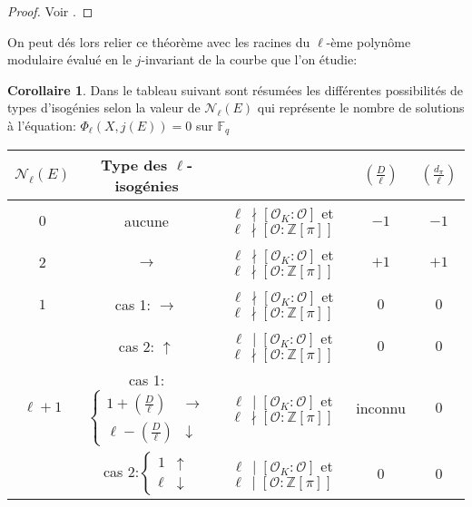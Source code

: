 \documentclass[10pt,a4paper]{book}
\theoremstyle{plain}
\theoremstyle{definition}
\theoremstyle{definition}
\newtheorem{cor}[thm]{Corollaire}
\theoremstyle{definition}
\theoremstyle{definition}
\theoremstyle{remark}
\theoremstyle{remark}
\theoremstyle{definition}
\begin{document}
\begin{proof}
Voir \cite[Proposition 23]{Kohel96}.
\end{proof}

On peut dés lors relier ce théorème avec les racines du $\ell$-ème polynôme modulaire évalué en le $j$-invariant de la courbe que l'on étudie:

\begin{cor}
\label{cor:tab:vol} 
Dans le tableau suivant sont résumées les différentes possibilités de types d'isogénies selon la valeur de $\mathcal{N}_{\ell}(E)$ qui représente le nombre de solutions à l'équation: $\Phi_{\ell}(X,j(E))=0$ sur $\mathbb{F}_q$
\newline
\begin{tabular}{|c|c|c|c|c|}
\hline 
$\mathcal{N}_{\ell}(E)$ & Type des $\ell$-isogénies &  & $\left(\frac{D}{\ell}\right)$ & $\left(\frac{d_{\pi}}{\ell}\right)$\tabularnewline
\hline 
\hline 
$0$ & aucune & $\ell \,\nmid[\mathcal{O}_{K}:\mathcal{O}]$ et $\ell \,\nmid[\mathcal{O}:\mathbb{Z}[\pi]]$  & $-1$ & $-1$\\
\hline 
$2$ & $\rightarrow$ & $\ell \,\nmid[\mathcal{O}_{K}:\mathcal{O}]$ et $\ell \,\nmid[\mathcal{O}:\mathbb{Z}[\pi]]$  & $+1$ & $+1$\\
\hline 
$1$ & cas 1: $\rightarrow$ & $\ell\,\nmid[\mathcal{O}_{K}:\mathcal{O}]$ et $\ell\,\nmid[\mathcal{O}:\mathbb{Z}[\pi]]$  & $0$ & $0$\\

\cline{2-5} & cas 2: $\uparrow$ & $\ell\,\mid[\mathcal{O}_{K}:\mathcal{O}]$ et $\ell\,\nmid[\mathcal{O}:\mathbb{Z}[\pi]]$  & $0$ & $0$\\
\hline 
$\ell+1$ & cas 1:$\left\{ \begin{array}{cc}
1+\left(\frac{D}{\ell}\right) & \rightarrow\\
\ell-\left(\frac{D}{\ell}\right) & \downarrow
\end{array}\right.$ & $\ell \,\mid[\mathcal{O}_{K}:\mathcal{O}]$ et $\ell \,\nmid[\mathcal{O}:\mathbb{Z}[\pi]]$  & inconnu & $0$\\
 
\cline{2-5} & cas 2:$\left\{ \begin{array}{cc}
1 & \uparrow\\
\ell & \downarrow
\end{array}\right.$ & $\ell \,\mid[\mathcal{O}_{K}:\mathcal{O}]$ et $\ell \,\mid[\mathcal{O}:\mathbb{Z}[\pi]]$  & $0$ & $0$ \\
\hline 
\end{tabular}
\end{cor}
\end{document}
